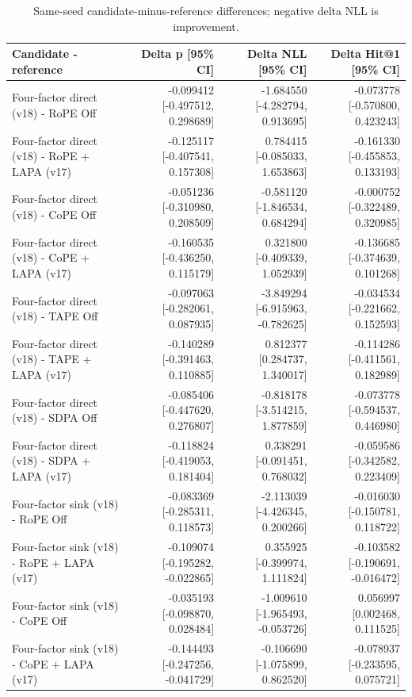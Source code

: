 \begin{table}[t]
\centering
\scriptsize
\caption{Same-seed candidate-minus-reference differences; negative delta NLL is improvement.}
\begin{tabular}{lrrr}
\toprule
Candidate - reference & Delta p [95\% CI] & Delta NLL [95\% CI] & Delta Hit@1 [95\% CI] \\
\midrule
Four-factor direct (v18) - RoPE Off & -0.099412 [-0.497512, 0.298689] & -1.684550 [-4.282794, 0.913695] & -0.073778 [-0.570800, 0.423243] \\
Four-factor direct (v18) - RoPE + LAPA (v17) & -0.125117 [-0.407541, 0.157308] & 0.784415 [-0.085033, 1.653863] & -0.161330 [-0.455853, 0.133193] \\
Four-factor direct (v18) - CoPE Off & -0.051236 [-0.310980, 0.208509] & -0.581120 [-1.846534, 0.684294] & -0.000752 [-0.322489, 0.320985] \\
Four-factor direct (v18) - CoPE + LAPA (v17) & -0.160535 [-0.436250, 0.115179] & 0.321800 [-0.409339, 1.052939] & -0.136685 [-0.374639, 0.101268] \\
Four-factor direct (v18) - TAPE Off & -0.097063 [-0.282061, 0.087935] & -3.849294 [-6.915963, -0.782625] & -0.034534 [-0.221662, 0.152593] \\
Four-factor direct (v18) - TAPE + LAPA (v17) & -0.140289 [-0.391463, 0.110885] & 0.812377 [0.284737, 1.340017] & -0.114286 [-0.411561, 0.182989] \\
Four-factor direct (v18) - SDPA Off & -0.085406 [-0.447620, 0.276807] & -0.818178 [-3.514215, 1.877859] & -0.073778 [-0.594537, 0.446980] \\
Four-factor direct (v18) - SDPA + LAPA (v17) & -0.118824 [-0.419053, 0.181404] & 0.338291 [-0.091451, 0.768032] & -0.059586 [-0.342582, 0.223409] \\
Four-factor sink (v18) - RoPE Off & -0.083369 [-0.285311, 0.118573] & -2.113039 [-4.426345, 0.200266] & -0.016030 [-0.150781, 0.118722] \\
Four-factor sink (v18) - RoPE + LAPA (v17) & -0.109074 [-0.195282, -0.022865] & 0.355925 [-0.399974, 1.111824] & -0.103582 [-0.190691, -0.016472] \\
Four-factor sink (v18) - CoPE Off & -0.035193 [-0.098870, 0.028484] & -1.009610 [-1.965493, -0.053726] & 0.056997 [0.002468, 0.111525] \\
Four-factor sink (v18) - CoPE + LAPA (v17) & -0.144493 [-0.247256, -0.041729] & -0.106690 [-1.075899, 0.862520] & -0.078937 [-0.233595, 0.075721] \\

\end{tabular}
\end{table}
